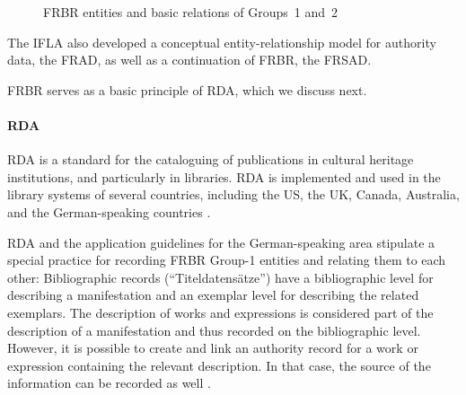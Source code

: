 \begin{figure}[ht]
  
  \caption[FRBR entities and basic relations of Groups~1 and~2]{\gls{FRBR} entities and basic relations of Groups~1 and~2 \autocite[following][]{FRBRpic1,FRBRpic2}}
  \label{fig:FRBR}
\end{figure}

The \gls{IFLA} also developed
a conceptual entity-relationship model for authority data,
the \gls{FRAD},
as well as a continuation of FRBR,
the \gls{FRSAD}.

FRBR serves as a basic principle of RDA, which we discuss next.

\paragraph{RDA}

\gls{RDA} is a standard for the cataloguing of publications
in cultural heritage institutions, and particularly in libraries.
RDA is implemented and used in the library systems of several countries, including
the US, the UK, Canada, Australia, and the German-speaking countries
\autocite{WikiDE_RDA}.

RDA and the application guidelines for the German-speaking area
stipulate a special practice for recording FRBR Group-1 entities and relating 
them to each other: Bibliographic records (\enquote{Titel\-daten\-sätze})
have a bibliographic level for describing a manifestation
and an exemplar level for describing the related exemplars. The description of works and expressions
is considered part of the description of a manifestation and thus recorded on the bibliographic level.
However, it is possible to create and link an authority record for a work or expression
containing the relevant description. In that case, the source of the information can be recorded as well
\autocite[cf.][§5.1]{Wiesenmueller2015}.

